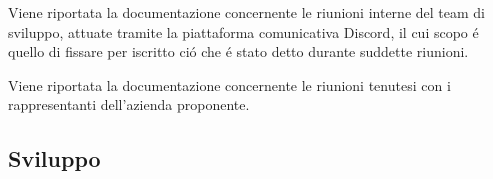 Viene riportata la documentazione concernente le riunioni interne del team di sviluppo, attuate tramite la piattaforma comunicativa Discord, il cui scopo é quello di fissare per iscritto ció che é stato detto durante suddette riunioni. %

Viene riportata la documentazione concernente le riunioni tenutesi con i rappresentanti dell'azienda proponente. %

\subsection{Sviluppo}